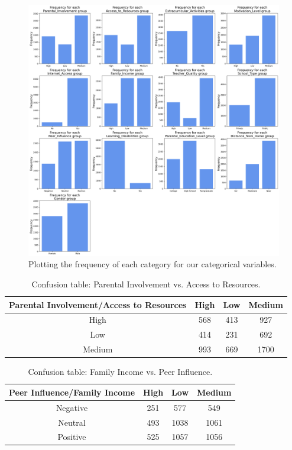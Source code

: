 \documentclass[twocolumn]{article} %
\begin{document}
\begin{figure}[h]
  \centering
  \includegraphics[width=0.9\columnwidth]{1-barplots.png}
  \caption{Plotting the frequency of each category for our categorical variables.}
  \label{1:barplots}
\end{figure}

\newpage
\renewcommand{\tablename}{Supplementary Table}
\setcounter{table}{0}

\begin{table}[ht]
  \centering
  \begin{tabular}{|c|c|c|c|}
      \hline
      \textbf{Parental Involvement/Access to Resources} & \textbf{High} & \textbf{Low} & \textbf{Medium} \\ \hline
      High   & 568  & 413  & 927  \\ \hline
      Low    & 414  & 231  & 692  \\ \hline
      Medium & 993  & 669  & 1700 \\ \hline
  \end{tabular}
  \caption{Confusion table: Parental Involvement vs. Access to Resources.}
  \label{tab:confusion1}
\end{table}

\begin{table}[ht]
  \centering
  \begin{tabular}{|c|c|c|c|}
      \hline
      \textbf{Peer Influence/Family Income} & \textbf{High} & \textbf{Low} & \textbf{Medium} \\ \hline
      Negative & 251 & 577 & 549 \\ \hline
      Neutral  & 493 & 1038 & 1061 \\ \hline
      Positive & 525 & 1057 & 1056 \\ \hline
  \end{tabular}
  \caption{Confusion table: Family Income vs. Peer Influence.}
  \label{tab:confusion2}
\end{table}
\end{document}
